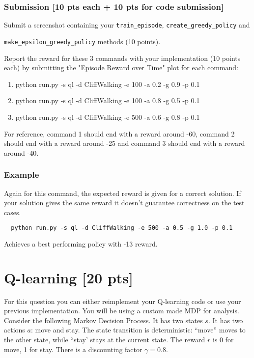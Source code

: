 \documentclass[a4paper]{article}
\theoremstyle{definition}
\begin{document}
\subsubsection*{Submission [10 pts each + 10 pts for code submission]}

Submit a screenshot containing your \verb|train_episode|, \verb|create_greedy_policy| and 

\verb|make_epsilon_greedy_policy| methods (10 points). 

Report the reward for these 3 commands with your implementation (10 points each) by submitting the "Episode Reward over Time" plot for each command:

\begin{enumerate}
    \item  python run.py -s ql -d CliffWalking -e 100 -a 0.2 -g 0.9 -p 0.1
    \item  python run.py -s ql -d CliffWalking -e 100 -a 0.8 -g 0.5 -p 0.1  
    \item  python run.py -s ql -d CliffWalking -e 500 -a 0.6 -g 0.8 -p 0.1   
\end{enumerate}

For reference, command 1 should end with a reward around -60, command 2 should end with a reward around -25 and command 3 should end with a reward around -40.

\subsubsection*{Example}

Again for this command, the expected reward is given for a correct solution. If your solution gives the same reward it doesn't guarantee correctness on the test cases.

\begin{verbatim}
  python run.py -s ql -d CliffWalking -e 500 -a 0.5 -g 1.0 -p 0.1  
\end{verbatim}

Achieves a best performing policy with -13 reward.

\section{Q-learning [20 pts]}
For this question you can either reimplement your Q-learning code or use your previous implementation. You will be using a custom made MDP for analysis. Consider the following Markov Decision Process.
It has two states $s$. It has two actions $a$: move and stay. The state transition is deterministic: ``move'' moves to the other state, while ``stay' stays at the current state. The reward $r$ is 0 for move,  1 for stay. There is a discounting factor $\gamma=0.8$.
\\
\end{document}
